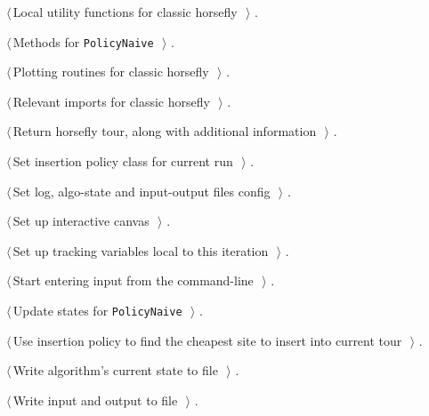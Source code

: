 \documentclass[11.5pt]{report}
\begin{document}
{\begin{list}{}{\setlength{\itemsep}{-\parsep}\setlength{\itemindent}{-\leftmargin}}
\item $\langle\,$Local utility functions for classic horsefly\nobreak\ {\footnotesize {}}$\,\rangle$ {\footnotesize {\NWtxtRefIn} .}
\item $\langle\,$Methods for \verb|PolicyNaive|\nobreak\ {\footnotesize {}}$\,\rangle$ {\footnotesize {\NWtxtRefIn} .}
\item $\langle\,$Plotting routines for classic horsefly\nobreak\ {\footnotesize {}}$\,\rangle$ {\footnotesize {\NWtxtRefIn} .}
\item $\langle\,$Relevant imports for classic horsefly\nobreak\ {\footnotesize {}}$\,\rangle$ {\footnotesize {\NWtxtRefIn} .}
\item $\langle\,$Return horsefly tour, along with additional information\nobreak\ {\footnotesize {}}$\,\rangle$ {\footnotesize {\NWtxtRefIn} .}
\item $\langle\,$Set insertion policy class for current run\nobreak\ {\footnotesize {}}$\,\rangle$ {\footnotesize {\NWtxtRefIn} .}
\item $\langle\,$Set log, algo-state and input-output files config\nobreak\ {\footnotesize {}}$\,\rangle$ {\footnotesize {\NWtxtRefIn} .}
\item $\langle\,$Set up interactive canvas\nobreak\ {\footnotesize {}}$\,\rangle$ {\footnotesize {\NWtxtRefIn} .}
\item $\langle\,$Set up tracking variables local to this iteration\nobreak\ {\footnotesize {}}$\,\rangle$ {\footnotesize {\NWtxtRefIn} .}
\item $\langle\,$Start entering input from the command-line\nobreak\ {\footnotesize {}}$\,\rangle$ {\footnotesize {\NWtxtRefIn} .}
\item $\langle\,$Update states for \texttt{PolicyNaive}\nobreak\ {\footnotesize {}}$\,\rangle$ {\footnotesize {\NWtxtRefIn} .}
\item $\langle\,$Use insertion policy to find the cheapest site to insert into current tour\nobreak\ {\footnotesize {}}$\,\rangle$ {\footnotesize {\NWtxtRefIn} .}
\item $\langle\,$Write algorithm's current state to file\nobreak\ {\footnotesize {}}$\,\rangle$ {\footnotesize {\NWtxtRefIn} .}
\item $\langle\,$Write input and output to file\nobreak\ {\footnotesize {}}$\,\rangle$ {\footnotesize {\NWtxtRefIn} .}
\end{list}}
\end{document}
